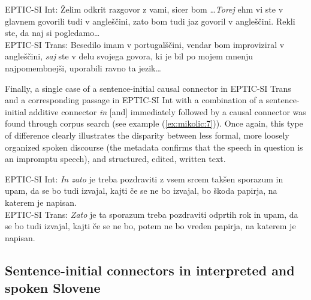 \documentclass[output=paper]{langscibook}
\begin{document}
\ea\label{ex:mikolic:6}
\ea
EPTIC-SI Int: Želim odkrit razgovor z vami, sicer bom \ldots \textit{Torej} ehm vi ste v glavnem govorili tudi v angleščini, zato bom tudi jaz govoril v angleščini. Rekli ste, da naj si pogledamo\ldots\\
\ex
EPTIC-SI Trans: Besedilo imam v portugalščini, vendar bom improviziral v angleščini, \textit{saj} ste v delu svojega govora, ki je bil po mojem mnenju najpomembnejši, uporabili ravno ta jezik\ldots\\
\z
\z

Finally, a single case of a sentence-initial causal connector in EPTIC-SI Trans and a corresponding passage in EPTIC-SI Int with a combination of a sentence-initial additive connector \textit{in} [and] immediately followed by a causal connector was found through corpus search (see example (\ref{ex:mikolic:7})). Once again, this type of difference clearly illustrates the disparity between less formal, more loosely organized spoken discourse (the metadata confirms that the speech in question is an impromptu speech), and structured, edited, written text.

\ea\label{ex:mikolic:7}
\ea
EPTIC-SI Int: \textit{In zato} je treba pozdraviti z vsem srcem takšen sporazum in upam, da se bo tudi izvajal, kajti če se ne bo izvajal, bo škoda papirja, na katerem je napisan. \\
\ex
EPTIC-SI Trans: \textit{Zato} je ta sporazum treba pozdraviti odprtih rok in upam, da se bo tudi izvajal, kajti če se ne bo, potem ne bo vreden papirja, na katerem je napisan.\\
\z
\z

\subsection{
Sentence-initial connectors in interpreted and spoken Slovene
}\label{ex:mikolic:5.2}
\end{document}
